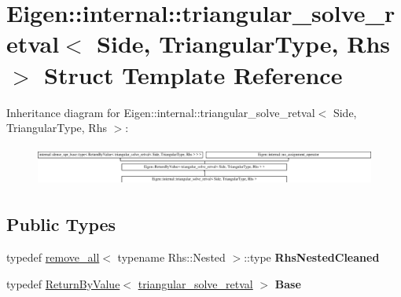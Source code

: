 \hypertarget{struct_eigen_1_1internal_1_1triangular__solve__retval}{}\section{Eigen\+::internal\+::triangular\+\_\+solve\+\_\+retval$<$ Side, Triangular\+Type, Rhs $>$ Struct Template Reference}
\label{struct_eigen_1_1internal_1_1triangular__solve__retval}
Inheritance diagram for Eigen\+::internal\+::triangular\+\_\+solve\+\_\+retval$<$ Side, Triangular\+Type, Rhs $>$\+:\begin{figure}[H]
\begin{center}
\leavevmode
\includegraphics[height=1.337580cm]{struct_eigen_1_1internal_1_1triangular__solve__retval}
\end{center}
\end{figure}
\subsection*{Public Types}
\begin{DoxyCompactItemize}
\item 
\mbox{\label{struct_eigen_1_1internal_1_1triangular__solve__retval_a271b468f839b82b4bab648151e3dd4f1}} 
typedef \mbox{\hyperlink{struct_eigen_1_1internal_1_1remove__all}{remove\+\_\+all}}$<$ typename Rhs\+::\+Nested $>$\+::type {\bfseries Rhs\+Nested\+Cleaned}
\item 
\mbox{\label{struct_eigen_1_1internal_1_1triangular__solve__retval_a6a2d39093c4dca2f29958baece6d1f1d}} 
typedef \mbox{\hyperlink{class_eigen_1_1_return_by_value}{Return\+By\+Value}}$<$ \mbox{\hyperlink{struct_eigen_1_1internal_1_1triangular__solve__retval}{triangular\+\_\+solve\+\_\+retval}} $>$ {\bfseries Base}
\end{DoxyCompactItemize}
